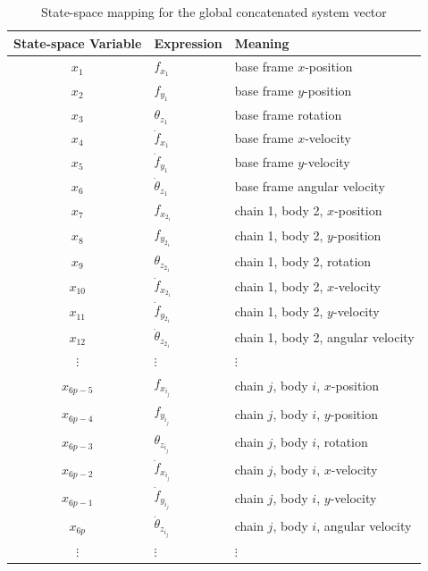 \begin{table}[htbp]
\centering
\caption{State-space mapping for the global concatenated system vector}
\label{tab:state_mapping}
\begin{tabular}{cll}
\toprule
State-space Variable & Expression & Meaning \\
\midrule
$x_1$       & $f_{x_1}$                  & base frame $x$-position \\
$x_2$       & $f_{y_1}$                  & base frame $y$-position \\
$x_3$       & $\theta_{z_1}$             & base frame rotation \\
$x_4$       & $\dot{f}_{x_1}$            & base frame $x$-velocity \\
$x_5$       & $\dot{f}_{y_1}$            & base frame $y$-velocity \\
$x_6$       & $\dot{\theta}_{z_1}$       & base frame angular velocity \\
$x_7$       & $f_{x_{2_1}}$              & chain 1, body 2, $x$-position \\
$x_8$       & $f_{y_{2_1}}$              & chain 1, body 2, $y$-position \\
$x_9$       & $\theta_{z_{2_1}}$         & chain 1, body 2, rotation \\
$x_{10}$    & $\dot{f}_{x_{2_1}}$        & chain 1, body 2, $x$-velocity \\
$x_{11}$    & $\dot{f}_{y_{2_1}}$        & chain 1, body 2, $y$-velocity \\
$x_{12}$    & $\dot{\theta}_{z_{2_1}}$   & chain 1, body 2, angular velocity \\
$\vdots$    & $\vdots$                   & $\vdots$ \\
$x_{6p-5}$  & $f_{x_{i_j}}$              & chain $j$, body $i$, $x$-position \\
$x_{6p-4}$  & $f_{y_{i_j}}$              & chain $j$, body $i$, $y$-position \\
$x_{6p-3}$  & $\theta_{z_{i_j}}$         & chain $j$, body $i$, rotation \\
$x_{6p-2}$  & $\dot{f}_{x_{i_j}}$        & chain $j$, body $i$, $x$-velocity \\
$x_{6p-1}$  & $\dot{f}_{y_{i_j}}$        & chain $j$, body $i$, $y$-velocity \\
$x_{6p}$    & $\dot{\theta}_{z_{i_j}}$   & chain $j$, body $i$, angular velocity \\
$\vdots$    & $\vdots$                   & $\vdots$ \\
\bottomrule
\end{tabular}
\end{table}


